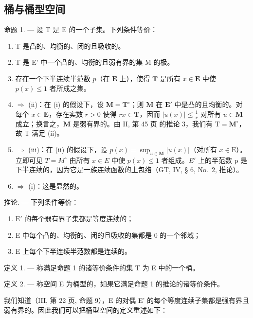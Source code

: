 \subsection{桶与桶型空间}

命题 1. --- 设 T 是 E 的一个子集。下列条件等价：

\begin{enumerate}
\def\labelenumi{(\roman{enumi})}
\item
  T 是凸的、均衡的、闭的且吸收的。
\item
  T 是 E' 中一个凸的、均衡的且弱有界的集 M 的极。
\item
  存在一个下半连续半范数 \(p\)（在 \(\mathbf{E}\) 上），使得 \(\mathbf{T}\) 是所有 \(x \in \mathbf{E}\) 中使 \(p(x) \leqslant 1\) 者所成之集。
\item
  \(\Rightarrow\) (ii)：在 (i) 的假设下，设 \(\mathbf{M} = \mathbf{T}^{\circ}\)；则 \(\mathbf{M}\) 在 \(\mathbf{E}'\) 中是凸的且均衡的。对每个 \(x \in \mathbf{E}\)，存在实数 \(r > 0\) 使得 \(rx \in \mathbf{T}\)，因而 \(|u(x)| \leqslant \frac{1}{r}\) 对所有 \(u \in \mathbf{M}\) 成立；换言之，\(\mathbf{M}\) 是弱有界的。由 II, 第 45 页 的推论 3，我们有 \(\mathrm{T} = \mathbf{M}^{\circ}\)，故 \(\mathrm{T}\) 满足 (ii)。
\item
  \(\Rightarrow\) (iii)：在 (ii) 的假设下，设 \(p(x) = \sup_{u\in \mathbf{M}}|u(x)|\)（对所有 \(x\in \mathrm{E}\)）。立即可见 \(T = M^{\circ}\) 由所有 \(x \in E\) 中使 \(p(x) \leqslant 1\) 者组成。\(E'\) 上的半范数 p 是下半连续的，因为它是一族连续函数的上包络（GT, IV, § 6, No.~2, 推论）。
\item
  \(\Rightarrow\) (i)：这是显然的。
\end{enumerate}

推论. --- 下列条件等价：

\begin{enumerate}
\def\labelenumi{(\roman{enumi})}
\item
  \(\mathrm{E}'\) 的每个弱有界子集都是等度连续的；
\item
  E 中每个凸的、均衡的、闭的且吸收的集都是 0 的一个邻域；
\item
  E 上每个下半连续半范数都是连续的。
\end{enumerate}

定义 1. --- 称满足命题 1 的诸等价条件的集 T 为 E 中的一个桶。

定义 2. --- 称空间 E 为桶型的，如果它满足命题 1 的推论的诸等价条件。

我们知道（III, 第 22 页, 命题 9），E 的对偶 E' 的每个等度连续子集都是强有界且弱有界的。因此我们可以把桶型空间的定义重述如下：

